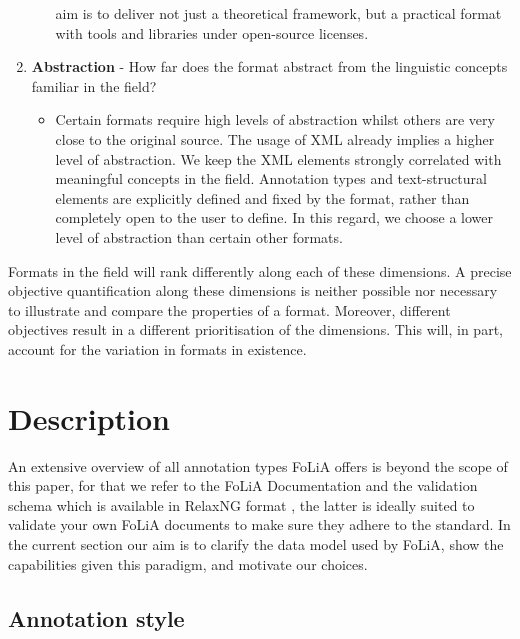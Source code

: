 \documentclass[a4paper,10pt,twoside]{article}
\begin{document}
\begin{enumerate}
\begin{itemize}
      aim is to deliver not just a theoretical framework, but a practical
      format with tools and libraries under open-source licenses.
  \end{itemize}
\item \textbf{Abstraction} - How far does the format abstract from the
  linguistic concepts familiar in the field?
  \begin{itemize}
    \item[] Certain formats require high levels of abstraction whilst others are
      very close to the original source. The usage of XML already implies a higher level of abstraction. We keep
      the XML elements strongly correlated with meaningful concepts in the
      field. Annotation types and text-structural elements are explicitly
      defined and fixed by the format, rather than completely open to the user
      to define. In this regard, we choose a lower level of abstraction than
      certain other formats. 
  \end{itemize}
\end{enumerate}

Formats in the field will rank differently along each of these dimensions. A
precise objective quantification along these dimensions is neither possible nor
necessary to illustrate and compare the properties of a format. Moreover,
different objectives result in a different prioritisation of the dimensions.
This will, in part, account for the variation in formats in existence.


\section{Description}
\label{sec:description}

An extensive overview of all annotation types FoLiA offers is beyond the scope
of this paper, for that we refer to the FoLiA Documentation \cite{FOLIA} and
the validation schema which is available in RelaxNG format \cite{RELAXNG}, the latter is
ideally suited to validate your own FoLiA documents to make sure they adhere to
the standard. In the current section our aim is to clarify the data model used by
FoLiA, show the capabilities given this paradigm, and motivate our choices.

\subsection{Annotation style}
\end{document}
